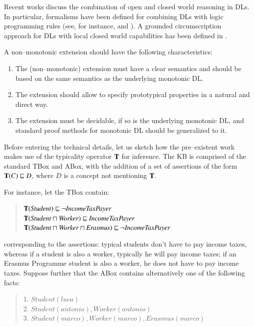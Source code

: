 \documentclass[a4paper, 11pt, oneside]{elsarticle}
\newcommand{\tip}{{\bf T}}
\newcommand{\sqset}{\sqsubseteq}
\newcommand{\mint}{\sqcap}
\begin{document}
Recent works discuss the combination of open and closed world reasoning in DLs. In particular, formalisms have been defined for combining DLs with logic programming rules (see, for instance, \cite{eiter2004} and \cite{rosatiacm}). A grounded circumscription approach for DLs with local closed world capabilities has been defined in \cite{hitzlerdl}.

\newpage

A non--monotonic extension should have the following characteristics:

\begin{enumerate}
\item The (non--monotonic) extension must have a clear semantics and should be based on the same semantics as the underlying monotonic DL.
\item The extension should allow to specify prototypical properties in a natural and direct way.
\item The extension must be decidable, if  so is the underlying monotonic DL, and standard proof methods for monotonic DL should be generalized to it.
\end{enumerate}


Before entering the technical details, let us sketch how the pre--existent work makes use of the typicality operator $\tip$ for inference. The KB is comprised of the standard TBox and ABox, with the addition of a set of assertions of the form $\tip(C)\sqsubseteq D$, where $D$ is a concept not mentioning $\tip$.

For instance, let the TBox contain:

\begin{quote}
$\tip (\mathit{Student}) \sqset \mathit{\neg IncomeTaxPayer}$\\
$\tip (\mathit{Student} \mint \mathit{Worker})  \sqset \mathit{IncomeTaxPayer}$\\
$\tip (\mathit{Student} \mint \mathit{Worker} \mint \mathit{Erasmus})  \sqset \mathit{\neg IncomeTaxPayer}$
\end{quote}


\noindent corresponding to the assertions: typical students don't have to pay income taxes, whereas if a student is also a worker, typically he will pay income taxes; if an Erasmus Programme student is also a worker, he does not have to pay income taxes.
Suppose  further that the ABox contains alternatively one of the following facts:

\begin{quote}
1. $\mathit{Student}(\mathit{luca})$ \\
2. $\mathit{Student}(\mathit{antonio}), \mathit{Worker}(\mathit{antonio})$ \\
3. $\mathit{Student}(\mathit{marco}), \mathit{Worker}(\mathit{marco}), Erasmus(\mathit{marco})$
\end{quote}
\end{document}

